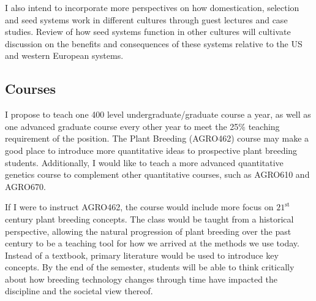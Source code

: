 \documentclass[11pt]{article}
\begin{document}

I also intend to incorporate more perspectives on how domestication, selection and seed systems work in different cultures through guest lectures and case studies. Review of how seed systems function in other cultures will cultivate discussion on the benefits and consequences of these systems relative to the US and western European systems. 

\subsection*{Courses}

I propose to teach one 400 level undergraduate/graduate course a year, as well as one advanced graduate course every other year to meet the 25\% teaching requirement of the position. The Plant Breeding (AGRO462) course may make a good place to introduce more quantitative ideas to prospective plant breeding students. Additionally, I would like to teach a more advanced quantitative genetics course to complement other quantitative courses, such as AGRO610 and AGRO670.


If I were to instruct AGRO462, the course would include more focus on $21^\text{st}$ century plant breeding concepts. The class would be taught from a historical perspective, allowing the natural progression of plant breeding over the past century to be a teaching tool for how we arrived at the methods we use today. Instead of a textbook, primary literature would be used to introduce key concepts. By the end of the semester, students will be able to think critically about how breeding technology changes through time have impacted the discipline and the societal view thereof. 
\end{document}
